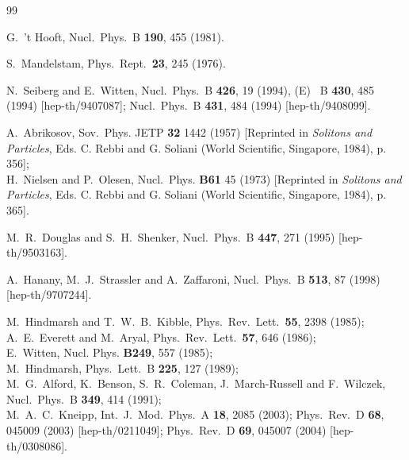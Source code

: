 \begin{thebibliography} {99}

G.~'t Hooft,
Nucl.\ Phys.\ B {\bf 190}, 455 (1981).

S.~Mandelstam,
Phys.\ Rept.\  {\bf 23}, 245 (1976).

N.~Seiberg and E.~Witten,
Nucl.\ Phys.\ B {\bf 426}, 19 (1994),
(E) \ B {\bf 430}, 485 (1994)
[hep-th/9407087];
Nucl.\ Phys.\ B {\bf 431}, 484 (1994)
[hep-th/9408099].

A.~Abrikosov, Sov.~Phys. JETP {\bf32} 1442  (1957)
[Reprinted in {\em Solitons and Particles}, Eds. C. Rebbi and G. Soliani
(World Scientific, Singapore, 1984), p. 356];\\
H.~Nielsen and P.~Olesen, Nucl.~Phys. {\bf B61} 45 (1973)
[Reprinted in {\em Solitons and Particles}, Eds. C. Rebbi and G. Soliani
(World Scientific, Singapore, 1984), p. 365].

M.~R.~Douglas and S.~H.~Shenker,
Nucl.\ Phys.\ B {\bf 447}, 271 (1995)
[hep-th/9503163].

A.~Hanany, M.~J.~Strassler and A.~Zaffaroni,
Nucl.\ Phys.\ B {\bf 513}, 87 (1998)
[hep-th/9707244].

M.~Hindmarsh and T.~W.~B.~Kibble,
Phys.\ Rev.\ Lett.\  {\bf 55}, 2398 (1985);
\\
A.~E.~Everett and M.~Aryal,
Phys.\ Rev.\ Lett.\  {\bf 57}, 646 (1986);
\\
E.~Witten,
Nucl. Phys. {\bf B249}, 557 (1985);
\\
M.~Hindmarsh,
Phys.\ Lett.\ B {\bf 225}, 127 (1989);
\\
M.~G.~Alford, K.~Benson, S.~R.~Coleman, J.~March-Russell and F.~Wilczek,
Nucl.\ Phys.\ B {\bf 349}, 414 (1991);
\\
M.~A.~C.~Kneipp,
Int.\ J.\ Mod.\ Phys.\ A {\bf 18}, 2085 (2003);
Phys.\ Rev.\ D {\bf 68}, 045009 (2003)
[hep-th/0211049];
Phys.\ Rev.\ D {\bf 69}, 045007 (2004)
[hep-th/0308086].


\end{thebibliography}
